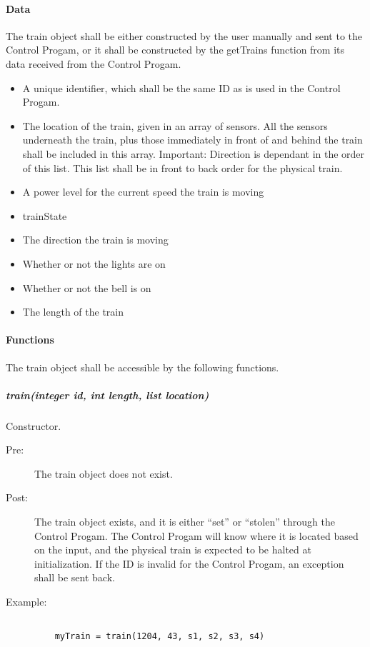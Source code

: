 \documentclass[a4paper,11pt,notitlepage]{article}
\def\CS{Control Progam\xspace} \def\LC{Local Copy of Train State\xspace} \def\TN{Track Node\xspace}
\begin{document}
\paragraph{Data}
The train object shall be either constructed by the user manually and sent to the \CS, or it shall be constructed by the getTrains function from its data received from the \CS.
\begin{itemize}
\item A unique identifier, which shall be the same ID as is used in the \CS.
\item The location of the train, given in an array of sensors. All the sensors underneath the train, plus those immediately in front of and behind the train shall be included in this array. Important: Direction is dependant in the order of this list. This list shall be in front to back order for the physical train.
\item A power level for the current speed the train is moving
\item trainState
\item The direction the train is moving
\item Whether or not the lights are on
\item Whether or not the bell is on
\item The length of the train
\end{itemize}
\paragraph{Functions}
The train object shall be accessible by the following functions.
\subparagraph{train(integer id, int length, list location)} Constructor. 
\begin{description}
\item[\hspace{1cm}Pre:] The train object does not exist. 
\item[\hspace{1cm}Post:] The train object exists, and it is either ``set'' or ``stolen'' through the \CS. The \CS will know where it is located based on the input, and the physical train is expected to be halted at initialization. If the ID is invalid for the \CS, an exception shall be sent back.
\item[\hspace{1cm}Example:]
\begin{verbatim}

    myTrain = train(1204, 43, s1, s2, s3, s4)
\end{verbatim}
\end{description}
\end{document}
